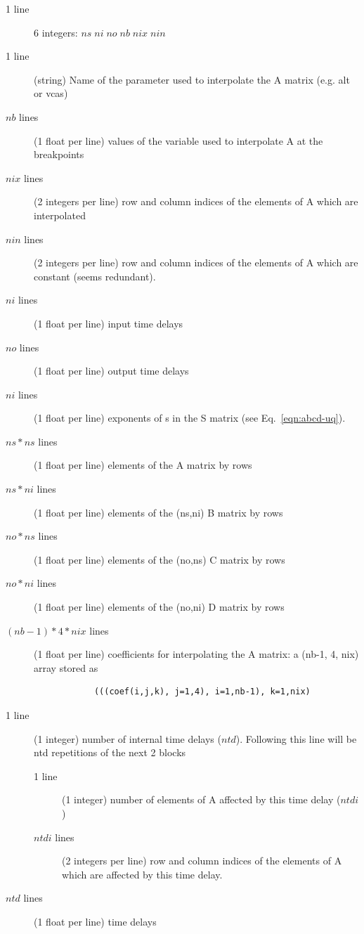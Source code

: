 \documentclass[10pt,openany,twoside]{book}
\numberwithin{equation}{section}   %
\newcommand{\Eqn}[1]{Eq.\ \ref{#1}}
\begin{document}
\begin{description}
	\item[1 line] 6 integers: $ns\; ni\; no\; nb\; nix\; nin$
	\item[1 line] (string) Name of the parameter used to interpolate the
		A matrix (e.g. alt or vcas)
	\item[$nb$ lines] (1 float per line) values of the variable used
                to interpolate A at the breakpoints
	\item[$nix$ lines] (2 integers per line) row and column indices of the elements
                of A which are interpolated
	\item[$nin$ lines] (2 integers per line) row and column indices of the elements
                of A which are constant (seems redundant).
	\item[$ni$ lines] (1 float per line) input time delays
	\item[$no$ lines] (1 float per line) output time delays
	\item[$ni$ lines] (1 float per line) exponents of s in the S matrix
                (see \Eqn{eqn:abcd-uq}).
   \item[$ns*ns$ lines] (1 float per line) elements of the A matrix by rows
	\item[$ns*ni$ lines] (1 float per line) elements of the (ns,ni) B matrix by rows
   \item[$no*ns$ lines] (1 float per line) elements of the (no,ns) C matrix by rows
	\item[$no*ni$ lines] (1 float per line) elements of the (no,ni) D matrix by rows
	\item[$(nb-1)*4*nix$ lines] (1 float per line) coefficients for interpolating
                the A matrix: a (nb-1, 4, nix) array stored as
			\nopagebreak
			{\scriptsize \ttfamily
			\begin{verbatim}
			(((coef(i,j,k), j=1,4), i=1,nb-1), k=1,nix)
			\end{verbatim}
			}
			\nopagebreak
	\item[1 line] (1 integer) number of internal time delays ($ntd$). Following
				this line will be ntd repetitions of the next 2 blocks
	\begin{description}
		\item[1 line] (1 integer) number of elements of A affected by this
				time delay ($ntdi$)
		\item[$ntdi$ lines] (2 integers per line) row and column indices of the elements
                of A which are affected by this time delay.
	\end{description}
	\item[$ntd$ lines] (1 float per line) time delays
\end{description}
\end{document}
